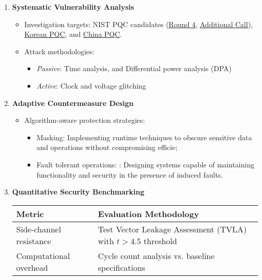 \documentclass[11pt, a4paper]{article}
\begin{document}
\begin{enumerate}[leftmargin=*, label=\textbf{\arabic*.}, series=main]
    \item \textbf{Systematic Vulnerability Analysis}
    \begin{itemize}[leftmargin=2em]
        \item Investigation targets: NIST PQC candidates (\href{https://csrc.nist.gov/projects/post-quantum-cryptography/round-4-submissions}{Round 4}, \href{https://csrc.nist.gov/projects/pqc-dig-sig/round-2-additional-signatures}{Additional Call}), 
        \href{https://www.kpqc.or.kr/competition.html}{Korean PQC}, and \href{https://niccs.org.cn/en/notice/}{China PQC}.
        \item Attack methodologies:
        \begin{itemize}
            \item \textit{Passive}: Time analysis, and Differential power analysis (DPA)
            \item \textit{Active}: Clock and voltage glitching
        \end{itemize}
    \end{itemize}
    
    \item \textbf{Adaptive Countermeasure Design}
    \begin{itemize}[leftmargin=2em]
        \item Algorithm-aware protection strategies:
        \begin{itemize}
            \item Masking: Implementing runtime techniques to obscure sensitive data and operations without compromising efficie;
            \item Fault tolerant operations: : Designing systems capable of maintaining functionality and security in the presence of induced faults.
        \end{itemize}
    \end{itemize}
    
    \item \textbf{Quantitative Security Benchmarking}
    \begin{center}
    \begin{tabularx}{\textwidth}{|l|X|}
        \toprule
        \rowcolor{gray!40} %
        \textbf{Metric} & \textbf{Evaluation Methodology} \\
        \midrule
        Side-channel resistance & Test Vector Leakage Assessment (TVLA) with $t > 4.5$ threshold \\
         \midrule
        Computational overhead & Cycle count analysis vs. baseline specifications \\
        \bottomrule
    \end{tabularx}
    \end{center}
\end{enumerate}
\end{document}
